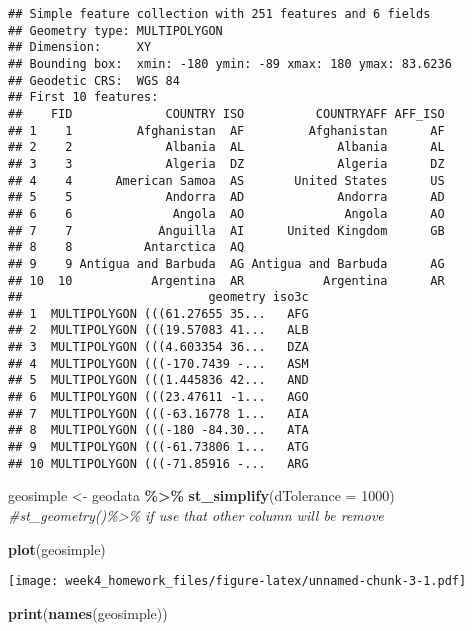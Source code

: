 \documentclass[
]{article}
\newenvironment{Shaded}{\begin{snugshade}}{\end{snugshade}}
\newcommand{\AttributeTok}[1]{\textcolor[rgb]{0.13,0.29,0.53}{#1}}
\newcommand{\CommentTok}[1]{\textcolor[rgb]{0.56,0.35,0.01}{\textit{#1}}}
\newcommand{\DecValTok}[1]{\textcolor[rgb]{0.00,0.00,0.81}{#1}}
\newcommand{\FunctionTok}[1]{\textcolor[rgb]{0.13,0.29,0.53}{\textbf{#1}}}
\newcommand{\NormalTok}[1]{#1}
\newcommand{\OtherTok}[1]{\textcolor[rgb]{0.56,0.35,0.01}{#1}}
\newcommand{\SpecialCharTok}[1]{\textcolor[rgb]{0.81,0.36,0.00}{\textbf{#1}}}
\begin{document}
\begin{verbatim}
## Simple feature collection with 251 features and 6 fields
## Geometry type: MULTIPOLYGON
## Dimension:     XY
## Bounding box:  xmin: -180 ymin: -89 xmax: 180 ymax: 83.6236
## Geodetic CRS:  WGS 84
## First 10 features:
##    FID             COUNTRY ISO          COUNTRYAFF AFF_ISO
## 1    1         Afghanistan  AF         Afghanistan      AF
## 2    2             Albania  AL             Albania      AL
## 3    3             Algeria  DZ             Algeria      DZ
## 4    4      American Samoa  AS       United States      US
## 5    5             Andorra  AD             Andorra      AD
## 6    6              Angola  AO              Angola      AO
## 7    7            Anguilla  AI      United Kingdom      GB
## 8    8          Antarctica  AQ                            
## 9    9 Antigua and Barbuda  AG Antigua and Barbuda      AG
## 10  10           Argentina  AR           Argentina      AR
##                          geometry iso3c
## 1  MULTIPOLYGON (((61.27655 35...   AFG
## 2  MULTIPOLYGON (((19.57083 41...   ALB
## 3  MULTIPOLYGON (((4.603354 36...   DZA
## 4  MULTIPOLYGON (((-170.7439 -...   ASM
## 5  MULTIPOLYGON (((1.445836 42...   AND
## 6  MULTIPOLYGON (((23.47611 -1...   AGO
## 7  MULTIPOLYGON (((-63.16778 1...   AIA
## 8  MULTIPOLYGON (((-180 -84.30...   ATA
## 9  MULTIPOLYGON (((-61.73806 1...   ATG
## 10 MULTIPOLYGON (((-71.85916 -...   ARG
\end{verbatim}

\begin{Shaded}
\begin{Highlighting}[]
\NormalTok{geosimple }\OtherTok{\textless{}{-}}\NormalTok{ geodata }\SpecialCharTok{\%\textgreater{}\%}
  \FunctionTok{st\_simplify}\NormalTok{(}\AttributeTok{dTolerance =} \DecValTok{1000}\NormalTok{)}
 \CommentTok{\#st\_geometry()\%\textgreater{}\% if use that other column will be remove}

\FunctionTok{plot}\NormalTok{(geosimple)}
\end{Highlighting}
\end{Shaded}

\texttt{[image: week4\_homework\_files/figure-latex/unnamed-chunk-3-1.pdf]}

\begin{Shaded}
\begin{Highlighting}[]
\FunctionTok{print}\NormalTok{(}\FunctionTok{names}\NormalTok{(geosimple))}
\end{Highlighting}
\end{Shaded}
\end{document}
